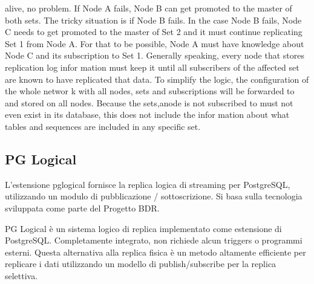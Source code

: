 alive, no problem. If Node A fails, Node B can get promoted to the master of both
sets. The tricky situation is if Node B fails.
In the case Node B fails, Node C needs to get promoted to the master of
Set 2 and it must continue replicating Set 1 from Node A. For that to be possible,
Node A must have knowledge about Node C and its subscription to Set 1. Generally
speaking, every node that stores replication log infor mation must keep it until
all subscribers of the affected set are known to have replicated that data.
To simplify the logic, the configuration of the whole networ k with all nodes,
sets and subscriptions will be forwarded to and stored on all nodes. Because the
sets,anode is not subscribed to must not even exist in its database, this does
not include the infor mation about what tables and sequences are included in any
specific set.

\item
\subsection{PG Logical}
L'estensione pglogical fornisce la replica logica di streaming per PostgreSQL, utilizzando un modulo di pubblicazione / sottoscrizione. Si basa sulla tecnologia sviluppata come parte del Progetto BDR.


PG Logical \`e un sistema logico di replica implementato come estensione di PostgreSQL. Completamente integrato, non richiede alcun triggers o programmi esterni. Questa alternativa alla replica fisica \`e un metodo altamente efficiente per replicare i dati utilizzando un modello di publish/subscribe per la replica selettiva.

